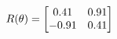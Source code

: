 \documentclass[preview]{standalone}
\begin{document}
\begin{align*}
\special{dvisvgm:raw <g id='unique000'>}R(\theta) = \begin{bmatrix}0.41 & 0.91\\-0.91 & 0.41\end{bmatrix}\special{dvisvgm:raw </g>}
\end{align*}
\end{document}

